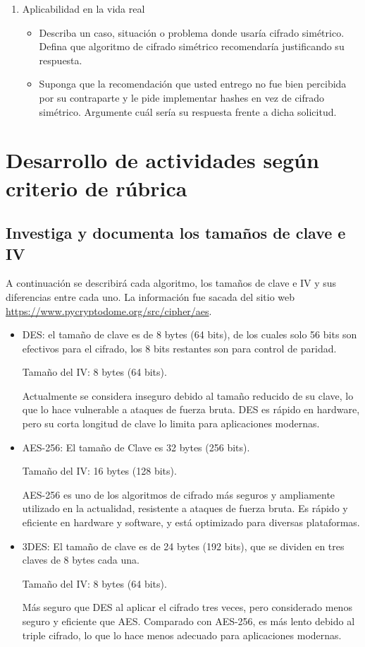 \documentclass[letter,12pt]{article}
\begin{document}
\begin{enumerate}
    \item Aplicabilidad en la vida real
    \begin{itemize}
        \item Describa un caso, situación o problema donde usaría cifrado simétrico. Defina que algoritmo de cifrado simétrico recomendaría justificando su respuesta.
        \item Suponga que la recomendación que usted entrego no fue bien percibida por su contraparte y le pide implementar hashes en vez de cifrado simétrico. Argumente cuál sería su respuesta frente a dicha solicitud. 
    \end{itemize}
\end{enumerate}



\section{Desarrollo de actividades según criterio de rúbrica}

\subsection{Investiga y documenta los tamaños de clave e IV}

A continuación se describirá cada algoritmo, los tamaños de clave e IV y sus diferencias entre cada uno. La información fue sacada del sitio web \url{https://www.pycryptodome.org/src/cipher/aes}.

\begin{itemize}
    \item DES: el tamaño de clave es de 8 bytes (64 bits), de los cuales solo 56 bits son efectivos para el cifrado, los 8 bits restantes son para control de paridad.
    
    Tamaño del IV: 8 bytes (64 bits).

    Actualmente se considera inseguro debido al tamaño reducido de su clave, lo que lo hace vulnerable a ataques de fuerza bruta. DES es rápido en hardware, pero su corta longitud de clave lo limita para aplicaciones modernas.

    \item AES-256: El tamaño de Clave es 32 bytes (256 bits).
    
    Tamaño del IV: 16 bytes (128 bits).

    AES-256 es uno de los algoritmos de cifrado más seguros y ampliamente utilizado en la actualidad, resistente a ataques de fuerza bruta. Es rápido y eficiente en hardware y software, y está optimizado para diversas plataformas.

    \item 3DES: El tamaño de clave es de 24 bytes (192 bits), que se dividen en tres claves de 8 bytes cada una.
    
    Tamaño del IV: 8 bytes (64 bits).

    Más seguro que DES al aplicar el cifrado tres veces, pero considerado menos seguro y eficiente que AES. Comparado con AES-256, es más lento debido al triple cifrado, lo que lo hace menos adecuado para aplicaciones modernas.
\end{itemize}
\end{document}
